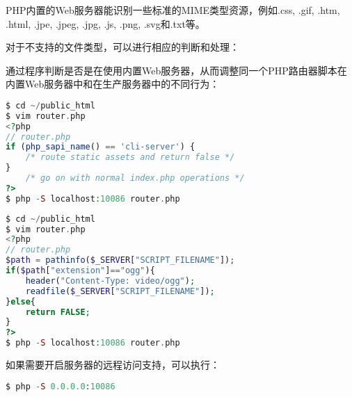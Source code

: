 PHP内置的Web服务器能识别一些标准的MIME类型资源，例如.css, .gif, .htm, .html, .jpe, .jpeg, .jpg, .js, .png, .svg和.txt等。

对于不支持的文件类型，可以进行相应的判断和处理：



通过程序判断是否是在使用内置Web服务器，从而调整同一个PHP路由器脚本在内置Web服务器中和在生产服务器中的不同行为：


\begin{lstlisting}[language=PHP]
$ cd ~/public_html
$ vim router.php
<?php
// router.php
if (php_sapi_name() == 'cli-server') {
    /* route static assets and return false */
}
    /* go on with normal index.php operations */
?>
$ php -S localhost:10086 router.php
\end{lstlisting}




\begin{lstlisting}[language=PHP]
$ cd ~/public_html
$ vim router.php
<?php
// router.php
$path = pathinfo($_SERVER["SCRIPT_FILENAME"]);
if($path["extension"]=="ogg"){
	header("Content-Type: video/ogg");
	readfile($_SERVER["SCRIPT_FILENAME"]);
}else{
	return FALSE;
}
?>
$ php -S localhost:10086 router.php
\end{lstlisting}

如果需要开启服务器的远程访问支持，可以执行：

\begin{lstlisting}[language=PHP]
$ php -S 0.0.0.0:10086
\end{lstlisting}




\begin{lstlisting}[language=PHP]

\end{lstlisting}



\begin{lstlisting}[language=PHP]

\end{lstlisting}




\begin{lstlisting}[language=PHP]

\end{lstlisting}




\begin{lstlisting}[language=PHP]

\end{lstlisting}




